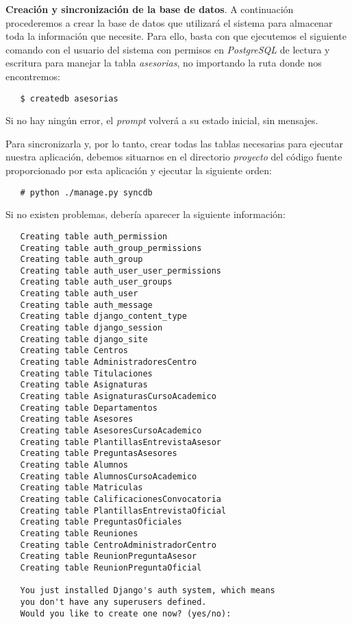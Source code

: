 \item \textbf{Creación y sincronización de la base de datos}.
   A continuación procederemos a crear la base de datos que utilizará el sistema
   para almacenar toda la información que necesite. Para ello, basta con que
   ejecutemos el siguiente comando con el usuario del sistema con permisos en
   \textit{PostgreSQL} de lectura y escritura para manejar la tabla
   \textit{asesorias}, no importando la ruta donde nos encontremos:

   \begin{verbatim}
   $ createdb asesorias
   \end{verbatim}

   Si no hay ningún error, el \textit{prompt} volverá a su estado inicial,
   sin mensajes.

   Para sincronizarla y, por lo tanto, crear todas las tablas necesarias para
   ejecutar nuestra aplicación, debemos situarnos en el directorio
   \textit{proyecto} del código fuente proporcionado por esta aplicación
   y ejecutar la siguiente orden:

   \begin{verbatim}
   # python ./manage.py syncdb
   \end{verbatim}

   Si no existen problemas, debería aparecer la siguiente información:

   \begin{verbatim}
   Creating table auth_permission
   Creating table auth_group_permissions
   Creating table auth_group
   Creating table auth_user_user_permissions
   Creating table auth_user_groups
   Creating table auth_user
   Creating table auth_message
   Creating table django_content_type
   Creating table django_session
   Creating table django_site
   Creating table Centros
   Creating table AdministradoresCentro
   Creating table Titulaciones
   Creating table Asignaturas
   Creating table AsignaturasCursoAcademico
   Creating table Departamentos
   Creating table Asesores
   Creating table AsesoresCursoAcademico
   Creating table PlantillasEntrevistaAsesor
   Creating table PreguntasAsesores
   Creating table Alumnos
   Creating table AlumnosCursoAcademico
   Creating table Matriculas
   Creating table CalificacionesConvocatoria
   Creating table PlantillasEntrevistaOficial
   Creating table PreguntasOficiales
   Creating table Reuniones
   Creating table CentroAdministradorCentro
   Creating table ReunionPreguntaAsesor
   Creating table ReunionPreguntaOficial

   You just installed Django's auth system, which means
   you don't have any superusers defined.
   Would you like to create one now? (yes/no):
   \end{verbatim}


